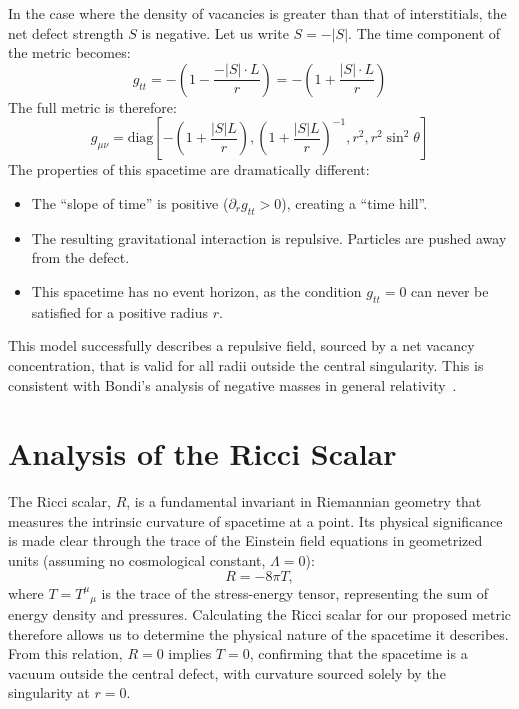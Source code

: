 \documentclass[%
  reprint,
  superscriptaddress,
  showpacs,
  showkeys,
  amsmath,amssymb,
  pra,
  longbibliography,
  floatfix,
  x11names
]{revtex4-2}
\begin{document}
In the case where the density of vacancies is greater than that of interstitials, the net defect strength $S$ is negative. Let us write $S = -|S|$. The time component of the metric becomes:
\begin{equation}
g_{tt} = -\left(1 - \frac{-|S| \cdot L}{r}\right) = -\left(1 + \frac{|S| \cdot L}{r}\right)
\end{equation}
The full metric is therefore:
\begin{equation}
g_{\mu\nu} = \text{diag}\left[-\left(1 + \frac{|S|L}{r}\right), \left(1 + \frac{|S|L}{r}\right)^{-1}, r^2, r^2 \sin^2 \theta\right]
\end{equation}
The properties of this spacetime are dramatically different:
\begin{itemize}
    \item The ``slope of time'' is positive ($\partial_r g_{tt} > 0$), creating a ``time hill''.
    \item The resulting gravitational interaction is repulsive. Particles are pushed away from the defect.
    \item This spacetime has {no event horizon}, as the condition $g_{tt}=0$ can never be satisfied for a positive radius $r$.
\end{itemize}
This model successfully describes a repulsive field, sourced by a net vacancy concentration,
that is valid for all radii outside the central singularity.
This is consistent with Bondi's analysis of negative masses in general relativity~\cite{bondi-1957}.

\section{Analysis of the Ricci Scalar}
\label{sec:ricci}

The Ricci scalar, $R$, is a fundamental invariant in Riemannian geometry that measures the intrinsic curvature of spacetime at a point. Its physical significance is made clear through the trace of the Einstein field equations in geometrized units (assuming no cosmological constant, $\Lambda=0$):
\begin{equation}
    R = -8\pi T,
\end{equation}
where $T = T^\mu{}_\mu$ is the trace of the stress-energy tensor, representing the sum of energy density and pressures. Calculating the Ricci scalar for our proposed metric therefore allows us to determine the physical nature of the spacetime it describes. From this relation, $R=0$ implies $T=0$, confirming that the spacetime is a vacuum outside the central defect, with curvature sourced solely by the singularity at $r=0$.
\end{document}
